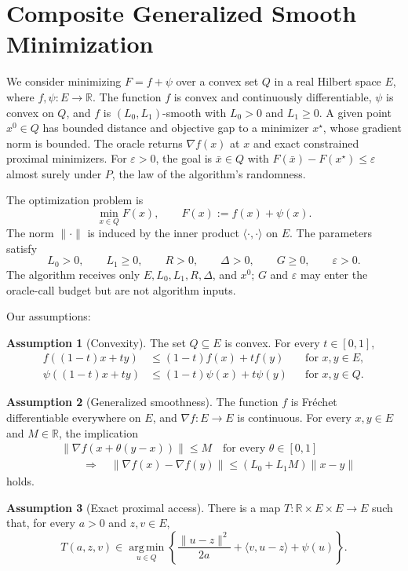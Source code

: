 \documentclass[10pt]{article}
\theoremstyle{definition}
\newtheorem{assumption}{Assumption}
\begin{document}
\section*{Composite Generalized Smooth Minimization}
We consider minimizing $F=f+\psi$ over a convex set $Q$ in a real Hilbert space $E$, where $f,\psi:E\to\mathbb{R}$. The function $f$ is convex and continuously differentiable, $\psi$ is convex on $Q$, and $f$ is $(L_0,L_1)$-smooth with $L_0>0$ and $L_1\geq0$. A given point $x^0\in Q$ has bounded distance and objective gap to a minimizer $x^\star$, whose gradient norm is bounded. The oracle returns $\nabla f(x)$ at $x$ and exact constrained proximal minimizers. For $\varepsilon>0$, the goal is $\bar{x}\in Q$ with $F(\bar{x})-F(x^\star)\leq\varepsilon$ almost surely under $P$, the law of the algorithm's randomness.

The optimization problem is
\[
\min_{x\in Q} F(x),
\qquad F(x):=f(x)+\psi(x).
\]
The norm $\|\cdot\|$ is induced by the inner product $\langle\cdot,\cdot\rangle$ on $E$. The parameters satisfy
\[
L_0>0,\qquad L_1\geq0,\qquad R>0,\qquad
\Delta>0,\qquad G\geq0,\qquad \varepsilon>0.
\]
The algorithm receives only $E,L_0,L_1,R,\Delta$, and $x^0$; $G$ and $\varepsilon$ may enter the oracle-call budget but are not algorithm inputs.

Our assumptions:
\begin{assumption}[Convexity]
The set $Q\subseteq E$ is convex. For every $t\in[0,1]$,
\[
\begin{aligned}
f((1-t)x+ty)&\leq(1-t)f(x)+tf(y)
&&\text{for }x,y\in E,\\
\psi((1-t)x+ty)&\leq(1-t)\psi(x)+t\psi(y)
&&\text{for }x,y\in Q.
\end{aligned}
\]
\end{assumption}

\begin{assumption}[Generalized smoothness]
The function $f$ is Fr\'echet differentiable everywhere on $E$, and $\nabla f:E\to E$ is continuous. For every $x,y\in E$ and $M\in\mathbb{R}$, the implication
\[
\begin{aligned}
&\|\nabla f(x+\theta(y-x))\|\leq M
\quad\text{for every }\theta\in[0,1]\\
&\qquad\Longrightarrow\quad
\|\nabla f(x)-\nabla f(y)\|
\leq(L_0+L_1M)\|x-y\|
\end{aligned}
\]
holds.
\end{assumption}

\begin{assumption}[Exact proximal access]
There is a map $T:\mathbb{R}\times E\times E\to E$ such that, for every $a>0$ and $z,v\in E$,
\[
T(a,z,v)\in\operatorname*{arg\,min}_{u\in Q}
\left\{
\frac{\|u-z\|^2}{2a}+\langle v,u-z\rangle+\psi(u)
\right\}.
\]
\end{assumption}
\end{document}
